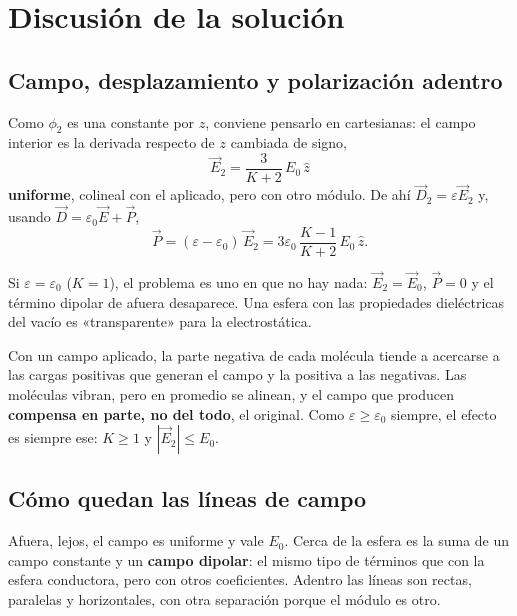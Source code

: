 \documentclass[12pt,a4paper]{article}
\begin{document}
\section{Discusión de la solución}

\subsection{Campo, desplazamiento y polarización adentro}

Como $\phi_2$ es una constante por $z$, conviene pensarlo en cartesianas: el campo
interior es la derivada respecto de $z$ cambiada de signo,
\[
\boxed{\ \vec E_2 = \frac{3}{K+2}\, E_0\, \hat z\ }
\]
\textbf{uniforme}, colineal con el aplicado, pero con otro módulo. De ahí
$\vec D_2 = \varepsilon\vec E_2$ y, usando $\vec D = \varepsilon_0\vec E + \vec P$,
\[
\vec P = (\varepsilon-\varepsilon_0)\, \vec E_2
= 3\varepsilon_0\,\frac{K-1}{K+2}\, E_0\, \hat z .
\]

\begin{notebox}
Si $\varepsilon = \varepsilon_0$ ($K=1$), el problema es uno en que no hay nada:
$\vec E_2 = \vec E_0$, $\vec P = 0$ y el término dipolar de afuera desaparece. Una
esfera con las propiedades dieléctricas del vacío es «transparente» para la
electrostática.
\end{notebox}

\begin{notebox}
Con un campo aplicado, la parte negativa de cada molécula tiende a acercarse a
las cargas positivas que generan el campo y la positiva a las negativas. Las
moléculas vibran, pero en promedio se alinean, y el campo que producen
\textbf{compensa en parte, no del todo}, el original. Como
$\varepsilon \ge \varepsilon_0$ siempre, el efecto es siempre ese: $K \ge 1$ y
$|\vec E_2| \le E_0$.
\end{notebox}

\subsection{Cómo quedan las líneas de campo}

Afuera, lejos, el campo es uniforme y vale $E_0$. Cerca de la esfera es la suma de
un campo constante y un \textbf{campo dipolar}: el mismo tipo de términos que con
la esfera conductora, pero con otros coeficientes. Adentro las líneas son rectas,
paralelas y horizontales, con otra separación porque el módulo es otro.
\end{document}
